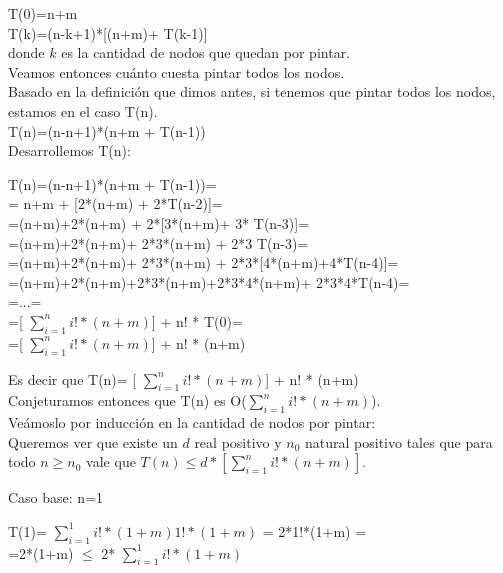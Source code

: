 \indent T(0)=n+m\\
\indent T(k)=(n-k+1)*[(n+m)+ T(k-1)]\\

donde $k$ es la cantidad de nodos que quedan por pintar.\\


\indent Veamos entonces cuánto cuesta pintar todos los nodos.\\
\indent Basado en la definición que dimos antes, si tenemos que pintar todos los nodos, estamos en el caso T(n).\\

\indent T(n)=(n-n+1)*(n+m + T(n-1))\\

\indent Desarrollemos T(n):\\


\begin{centering}
T(n)=(n-n+1)*(n+m + T(n-1))=\\
= n+m + [2*(n+m) + 2*T(n-2)]=\\
=(n+m)+2*(n+m) + 2*[3*(n+m)+ 3* T(n-3)]=\\
=(n+m)+2*(n+m)+ 2*3*(n+m) + 2*3 T(n-3)=\\
=(n+m)+2*(n+m)+ 2*3*(n+m) + 2*3*[4*(n+m)+4*T(n-4)]=\\
=(n+m)+2*(n+m)+2*3*(n+m)+2*3*4*(n+m)+ 2*3*4*T(n-4)=\\
=...=\\
=[ $\sum_{i=1}^{n} i! * (n+m) $] + n! * T(0)= \\
=[ $\sum_{i=1}^{n} i! * (n+m) $] + n! * (n+m)\\
\end{centering}


\indent Es decir que T(n)= [ $\sum_{i=1}^{n} i! * (n+m) $] + n! * (n+m)\\

\indent Conjeturamos entonces que T(n) es O($\sum_{i=1}^{n} i! * (n+m) $).\\

\indent Veámoslo por inducción en la cantidad de nodos por pintar:\\

\indent Queremos ver que existe un $d$ real positivo y $n_{0}$ natural positivo tales que para todo $n\geq n_{0}$ vale que $T(n) \leq d * [\sum_{i=1}^{n} i! * (n+m)] $.

\indent Caso base: n=1 \\

\begin{center}
T(1)= $\sum_{i=1}^{1} i! * (1+m)  1! * (1+m) $ = 2*1!*(1+m) =\\
=2*(1+m) $\leq$ 2*  $\sum_{i=1}^{1} i! * (1+m)$ \\
\end{center}

